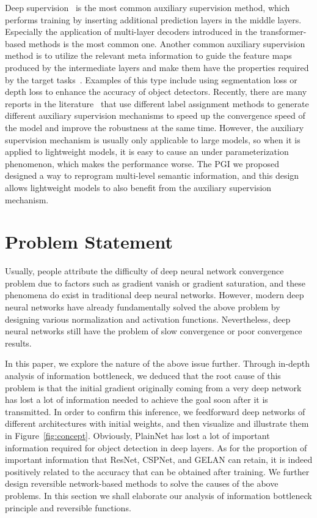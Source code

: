 \documentclass[10pt,twocolumn,letterpaper]{article}
\begin{document}
	Deep supervision~\cite{lee2015deeply,szegedy2015going,wang2015training} is the most common auxiliary supervision method, which performs training by inserting additional prediction layers in the middle layers.  Especially the application of multi-layer decoders introduced in the transformer-based methods is the most common one.  Another common auxiliary supervision method is to utilize the relevant meta information to guide the feature maps produced by the intermediate layers and make them have the properties required by the target tasks~\cite{levinshtein2020datnet,hayder2017boundary,huang2022monodtr,zhang2023monodetr,guo2020augfpn}.  Examples of this type include using segmentation loss or depth loss to enhance the accuracy of object detectors.  Recently, there are many reports in the literature~\cite{wang2021end,sun2021makes,zong2023detrs} that use different label assignment methods to generate different auxiliary supervision mechanisms to speed up the convergence speed of the model and improve the robustness at the same time.  However, the auxiliary supervision mechanism is usually only applicable to large models, so when it is applied to lightweight models, it is easy to cause an under parameterization phenomenon, which makes the performance worse.  The PGI we proposed designed a way to reprogram multi-level semantic information, and this design allows lightweight models to also benefit from the auxiliary supervision mechanism. 
	
	\section{Problem Statement}
	
	Usually, people attribute the difficulty of deep neural network convergence problem due to factors such as gradient vanish or gradient saturation, and these phenomena do exist in traditional deep neural networks.  However, modern deep neural networks have already fundamentally solved the above problem by designing various normalization and activation functions.  Nevertheless, deep neural networks still have the problem of slow convergence or poor convergence results.  
	
	In this paper, we explore the nature of the above issue further.  Through in-depth analysis of information bottleneck, we deduced that the root cause of this problem is that the initial gradient originally coming from a very deep network has lost a lot of information needed to achieve the goal soon after it is transmitted. In order to confirm this inference, we feedforward deep networks of different architectures with initial weights, and then visualize and illustrate them in Figure~\ref{fig:concept}.  Obviously, PlainNet has lost a lot of important information required for object detection in deep layers.  As for the proportion of important information that ResNet, CSPNet, and GELAN can retain, it is indeed positively related to the accuracy that can be obtained after training.  We further design reversible network-based methods to solve the causes of the above problems.  In this section we shall elaborate our analysis of information bottleneck principle and reversible functions.
\end{document}
